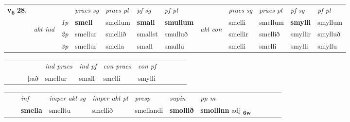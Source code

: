 \begin{tabular}{llllllllllll} \toprule
\multirow{4}{*}{{{\textbf{v{\textsubscript{6}}} \Large{\textbf{28.}}}}}  & &   &  \textit{praes sg}  & \textit{praes pl}  &\textit{ pf sg} & \textit{pf pl} &  &  \textit{praes sg}  & \textit{praes pl}  & \textit{pf sg} & \textit{pf pl } \\*
	\cmidrule{4-7} \cmidrule{9-12}
 & \multirow{3}{*}{\begin{turn}{90}\textit{akt ind}\end{turn}} & {\textit{1p}} & \textbf{smell} & smellum    & \textbf{small} & \textbf{smullum} & \multirow{3}{*}{\begin{turn}{90}\textit{akt con}\end{turn}} &smelli & smellum & \textbf{smylli} & smyllum\\*
& &  {\textit{2p}} &  smellur  & smellið   & smallst & smulluð & & smellir & smellið & smyllir & smylluð \\*
& &  {\textit{3p}} & smellur & smella   & small & smullu & & smelli & smelli& smylli & smyllu  \\*
\cmidrule{4-7} \cmidrule{9-12}
\end{tabular}


\begin{tabular}{llllllllllll}
 & &  & &  \textit{ind praes} & \textit{ind pf} & \textit{con praes} & \textit{con pf} \\*
&  & & það & smellur & small & smelli & smylli \\*
\cmidrule{5-9}
\end{tabular}


\begin{tabular}{llllllllllll}
 & & \textit{inf} & \textit{imper akt sg} & \textit{imper akt pl}   & \textit{presp} & \textit{supin}  & \textit{pp m}     \\*
  & & \textbf{smella} & smelltu  & smellið   & smellandi &  \textbf{smollið}  & \textbf{smollinn} adj \textbf{\textsubscript{6w}} \\*
\cmidrule{1-12}
\end{tabular}



